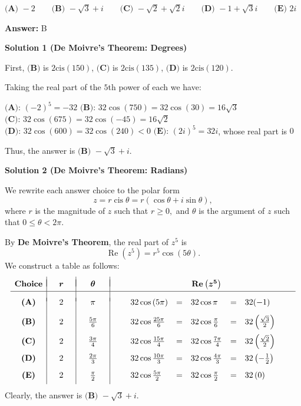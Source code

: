 \begin{enumerate}
 $\textbf{(A) }{-}2 \qquad \textbf{(B) }{-}\sqrt3+i \qquad \textbf{(C) }{-}\sqrt2+\sqrt2 i \qquad \textbf{(D) }{-}1+\sqrt3 i\qquad \textbf{(E) }2i$

 \textbf{Answer: }B



\textbf{Solution 1 (De Moivre's Theorem: Degrees)}

First, $\textbf{(B)}$ is $2\text{cis}(150)$, $\textbf{(C)}$ is $2\text{cis}(135)$, $\textbf{(D)}$ is $2\text{cis}(120)$.

 Taking the real part of the $5$th power of each we have:

 $\textbf{(A): }(-2)^5=-32$
$\textbf{(B): }32\cos(750)=32\cos(30)=16\sqrt{3}$
$\textbf{(C): }32\cos(675)=32\cos(-45)=16\sqrt{2}$
$\textbf{(D): }32\cos(600)=32\cos(240)<0$
$\textbf{(E): }(2i)^5=32i$, whose real part is $0$

 Thus, the answer is $\boxed{\textbf{(B) }{-}\sqrt3+i}$.

 



\textbf{Solution 2 (De Moivre's Theorem: Radians)}

We rewrite each answer choice to the polar form 
 \[z=r\operatorname{cis}\theta=r(\cos\theta+i\sin\theta),\] where $r$ is the magnitude of $z$ such that $r\geq0,$ and $\theta$ is the argument of $z$ such that $0\leq\theta<2\pi.$

 By \textbf{De Moivre's Theorem}, the real part of $z^5$ is 
 \[\operatorname{Re}\left(z^5\right)=r^5\cos{(5\theta)}.\] We construct a table as follows:
 \[\begin{array}{c|ccc|ccc|cclclclcc} & & & & & & & & & & & & & & &  \\ [-2ex] \textbf{Choice} & & \boldsymbol{r} & & & \boldsymbol{\theta} & & & & & & \multicolumn{1}{c}{\boldsymbol{\operatorname{Re}\left(z^5\right)}} & & & & \\ [0.5ex] \hline & & & & & & & & & & & & & & &  \\ [-1ex] \textbf{(A)} & & 2 & & & \pi & & & &32\cos{(5\pi)}&=&32\cos\pi&=&32(-1)& & \\ [2ex] \textbf{(B)} & & 2 & & & \frac{5\pi}{6} & & & &32\cos{\frac{25\pi}{6}}&=&32\cos{\frac{\pi}{6}}&=&32\left(\frac{\sqrt3}{2}\right)& & \\ [2ex] \textbf{(C)} & & 2 & & & \frac{3\pi}{4} & & & &32\cos{\frac{15\pi}{4}}&=&32\cos{\frac{7\pi}{4}}&=&32\left(\frac{\sqrt2}{2}\right)& & \\ [2ex] \textbf{(D)} & & 2 & & & \frac{2\pi}{3} & & & &32\cos{\frac{10\pi}{3}}&=&32\cos{\frac{4\pi}{3}}&=&32\left(-\frac{1}{2}\right)& & \\ [2ex] \textbf{(E)} & & 2 & & & \frac{\pi}{2} & & & &32\cos{\frac{5\pi}{2}}&=&32\cos{\frac{\pi}{2}}&=&32\left(0\right)& & \\ [1ex] \end{array}\]Clearly, the answer is $\boxed{\textbf{(B) }{-}\sqrt3+i}.$





\end{enumerate}
